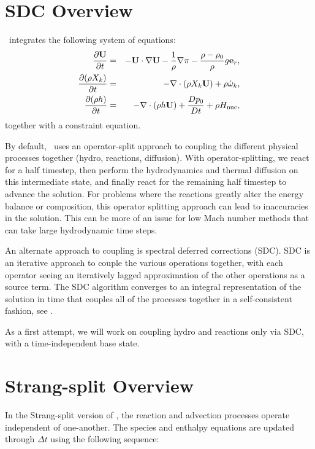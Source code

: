 \section{SDC Overview}

\maestro\ integrates the following system of equations:
\begin{eqnarray}
\frac{\partial{\bf U}}{\partial t} &=& 
    -{\bf U}\cdot\nabla{\bf U}  - \frac{1}{\rho}\nabla\pi 
    - \frac{\rho-\rho_0}{\rho} g{\bf e}_r,\label{eq:momentum}\\
\frac{\partial(\rho X_k)}{\partial t} &=& 
    -\nabla\cdot(\rho X_k{\bf U}) + \rho\dot{\omega}_k,\label{eq:species}\\
\frac{\partial(\rho h)}{\partial t} &=& 
    -\nabla\cdot(\rho h{\bf U}) + \frac{Dp_0}{Dt} 
    + \rho{H_{\rm nuc}} ,\label{eq:enthalpy}
\end{eqnarray}
together with a constraint equation.

By default, \maestro\ uses an operator-split approach to coupling
the different physical processes together (hydro, reactions, diffusion).
With operator-splitting, we
react for a half timestep, then perform the hydrodynamics and thermal
diffusion on this intermediate state, and finally react for the
remaining half timestep to advance the solution.  For problems where
the reactions greatly alter the energy balance or composition, this
operator splitting approach can lead to inaccuracies in the solution.
This can be more of an issue for low Mach number methods that can take
large hydrodynamic time steps.

An alternate approach to coupling is spectral deferred corrections
(SDC). SDC is an iterative approach to couple the various operations
together, with each operator seeing an iteratively lagged
approximation of the other operations as a source term.  The SDC
algorithm converges to an integral representation of the solution in
time that couples all of the processes together in a self-consistent
fashion, see \cite{Non11}.

As a first attempt, we will work on coupling hydro and reactions only
via SDC, with a time-independent base state.  



\section{Strang-split Overview}

In the Strang-split version of \maestro, the reaction and advection
processes operate independent of one-another.  The species and
enthalpy equations are updated through $\Delta t$ using the following
sequence:

